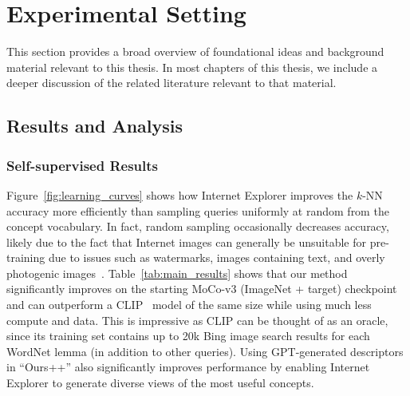 \chapter{Experimental Setting}
This section provides a broad overview of foundational ideas
and background material relevant to this thesis.
In most chapters of this thesis, we include a deeper
discussion of the related literature relevant to
that material.


\section{Results and Analysis}
\subsection{Self-supervised Results}
Figure~\ref{fig:learning_curves} shows how Internet Explorer improves the $k$-NN accuracy more efficiently than sampling queries uniformly at random from the concept vocabulary. In fact, random sampling occasionally decreases accuracy, likely due to the fact that Internet images can generally be unsuitable for pre-training due to issues such as watermarks, images containing text, and overly photogenic images~\cite{mezuman2012learning,chen2015webly}. Table~\ref{tab:main_results} shows that our method significantly improves on the starting MoCo-v3 (ImageNet + target) checkpoint and can outperform a CLIP~\cite{radford2021learning} model of the same size while using much less compute and data. This is impressive as CLIP can be thought of as an oracle, since its training set contains up to 20k Bing image search results for each WordNet lemma (in addition to other queries).
Using GPT-generated descriptors in ``Ours++'' also significantly improves performance by enabling Internet Explorer to generate diverse views of the most useful concepts. 

